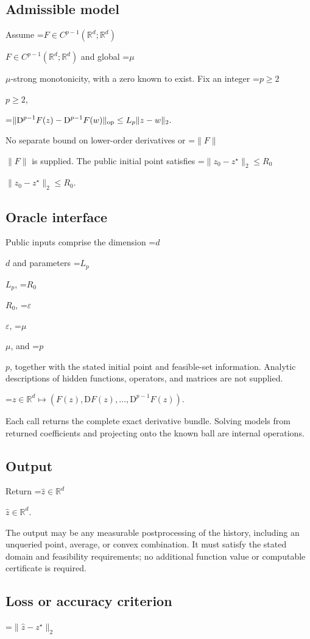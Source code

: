 \documentclass[10pt,a4paper]{article}
\newcommand{\AtlasMath}[1]{\par\begingroup\centering\setbox0=\hbox{$\displaystyle #1$}\ifdim\wd0>1.4\linewidth\typeout{ATLAS WIDE FORMULA: \the\wd0}\fi\ifdim\wd0>\linewidth\resizebox{\linewidth}{!}{\box0}\else\box0\fi\par\endgroup}
\newcommand{\AtlasInlineMath}[1]{\begingroup\setbox0=\hbox{$#1$}\ifdim\wd0>.4\linewidth\endgroup\AtlasMath{#1}\else\endgroup$#1$\fi}
\begin{document}
\subsection{Admissible model}
Assume \AtlasInlineMath{F\in C^{p-1}(\mathbb{R}^d;\mathbb{R}^d)} and global \AtlasInlineMath{\mu}-strong monotonicity, with a zero known to exist. Fix an integer \AtlasInlineMath{p\ge2},


\AtlasMath{\|\mathrm{D}^{p-1}F(z)-\mathrm{D}^{p-1}F(w)\|_{\rm op}\le L_p\|z-w\|_2.}


No separate bound on lower-order derivatives or \AtlasInlineMath{\|F\|} is supplied. The public initial point satisfies \AtlasInlineMath{\|z_0-z^\star\|_2\le R_0}.

\subsection{Oracle interface}
Public inputs comprise the dimension \AtlasInlineMath{d} and parameters \AtlasInlineMath{L_p}, \AtlasInlineMath{R_0}, \AtlasInlineMath{\varepsilon}, \AtlasInlineMath{\mu}, and \AtlasInlineMath{p}, together with the stated initial point and feasible-set information. Analytic descriptions of hidden functions, operators, and matrices are not supplied.


\AtlasMath{z\in\mathbb{R}^d\longmapsto(F(z),\mathrm{D}F(z),\ldots,\mathrm{D}^{p-1}F(z)).}


Each call returns the complete exact derivative bundle. Solving models from returned coefficients and projecting onto the known ball are internal operations.

\subsection{Output}
Return \AtlasInlineMath{\widehat{z}\in\mathbb{R}^d}.

The output may be any measurable postprocessing of the history, including an unqueried point, average, or convex combination. It must satisfy the stated domain and feasibility requirements; no additional function value or computable certificate is required.

\subsection{Loss or accuracy criterion}

\AtlasMath{\|\widehat{z}-z^\star\|_2}
\end{document}

